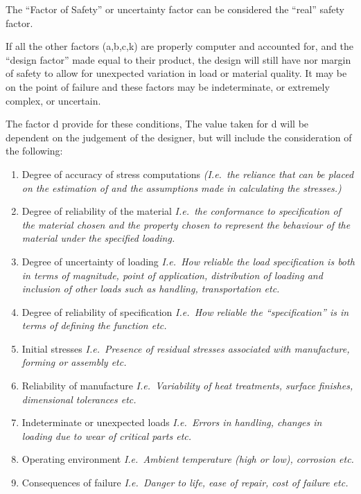 The ``Factor of Safety'' or uncertainty factor can be considered the ``real'' safety factor. 

If all the other factors (a,b,c,k) are properly computer and accounted for, and the ``design factor'' made equal to their product, the design will still have nor margin of safety to allow for unexpected variation in load or material quality. It may be on the point of failure and these factors may be indeterminate, or extremely complex, or uncertain.

The factor d provide for these conditions, The value taken for d will be dependent on the judgement of the designer, but will include the consideration of the following:

\begin{enumerate}
    \item Degree of accuracy of stress computations \emph{(I.e.\ the reliance that can be placed on the estimation of and the assumptions made in calculating the stresses.)}
    \item Degree of reliability of the material \emph{I.e.\ the conformance to specification of the material chosen and the property chosen to represent the behaviour of the material under the specified loading.}
    \item Degree of uncertainty of loading \emph{I.e.\ How reliable the load specification is both in terms of magnitude, point of application, distribution of loading and inclusion of other loads such as handling, transportation etc.}
    \item Degree of reliability of specification \emph{I.e.\ How reliable the ``specification'' is in terms of defining the function etc.}
    \item Initial stresses \emph{I.e.\ Presence of residual stresses associated with manufacture, forming or assembly etc.}
    \item Reliability of manufacture \emph{I.e.\ Variability of heat treatments, surface finishes, dimensional tolerances etc.}
    \item Indeterminate or unexpected loads \emph{I.e.\ Errors in handling, changes in loading due to wear of critical parts etc.}
    \item Operating environment \emph{I.e.\ Ambient temperature (high or low), corrosion etc.}
    \item Consequences of failure \emph{I.e.\ Danger to life, ease of repair, cost of failure etc.}
\end{enumerate}

